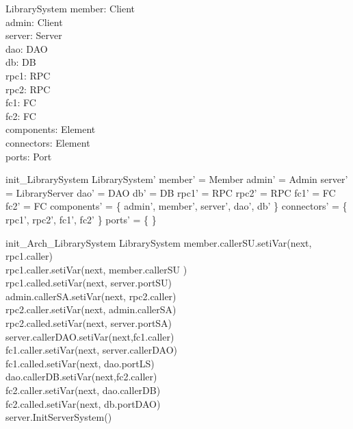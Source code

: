 \begin{schema}{LibrarySystem}
member:  Client \\
admin: Client \\
server: Server \\
dao: DAO \\ 
db: DB \\
rpc1: RPC \\
rpc2: RPC \\
fc1: FC \\
fc2: FC \\
components: \pset Element \\
connectors: \pset Element \\
ports: \pset Port 
\end{schema}

\begin{zed}
init\_LibrarySystem \sdef \lsch 
LibrarySystem' \bbar 
member' = \new Member 
\land admin' = \new Admin 
\land server' = \new LibraryServer
\land dao' = \new DAO
\land db' = \new DB
\land rpc1' = \new RPC
\land rpc2' = \new RPC
\land fc1' = \new FC 
\land fc2' = \new FC 
\land components' = \{ admin', member', server', dao', db' \}
\land connectors' = \{ rpc1', rpc2', fc1', fc2' \}
\land ports' = \{ \}  
\rsch  
\end{zed}

\begin{schema}{init\_Arch\_LibrarySystem}
\Delta LibrarySystem 
\where 
member.callerSU.setiVar(next, rpc1.caller) \\
rpc1.caller.setiVar(next, member.callerSU ) \\
rpc1.called.setiVar(next, server.portSU) \\

admin.callerSA.setiVar(next, rpc2.caller) \\
rpc2.caller.setiVar(next, admin.callerSA) \\
rpc2.called.setiVar(next, server.portSA) \\

server.callerDAO.setiVar(next,fc1.caller) \\
fc1.caller.setiVar(next, server.callerDAO) \\
fc1.called.setiVar(next, dao.portLS) \\

dao.callerDB.setiVar(next,fc2.caller) \\
fc2.caller.setiVar(next, dao.callerDB) \\
fc2.called.setiVar(next, db.portDAO) \\

server.InitServerSystem()
 
\end{schema}



